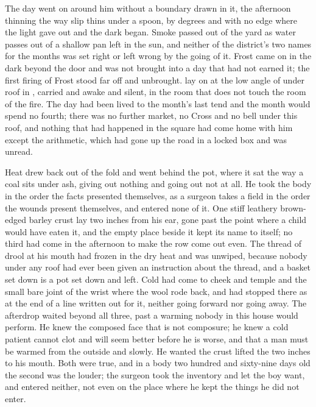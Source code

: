 The day went on around him without a boundary drawn in it, the afternoon thinning the way slip thins under a spoon, by degrees and with no edge where the light gave out and the dark began. Smoke passed out of the yard as water passes out of a shallow pan left in the sun, and neither of the district's two names for the months was set right or left wrong by the going of it. Frost came on in the dark beyond the door and was not brought into a day that had not earned it; the first firing of Frost stood far off and unbrought.  lay on  at the low angle of  under  roof in , carried and awake and silent, in the room that does not touch the room of the fire. The day had been lived to the month's last tend and the month would spend no fourth; there was no further market, no Cross and no bell under this roof, and nothing that had happened in the square had come home with him except the arithmetic, which had gone up the road in a locked box and was unread.

Heat drew back out of the fold and went behind the pot, where it sat the way a coal sits under ash, giving out nothing and going out not at all. He took the body in the order the facts presented themselves, as a surgeon takes a field in the order the wounds present themselves, and entered none of it. One stiff leathery brown-edged barley crust lay two inches from his ear, gone past the point where a child would have eaten it, and the empty place beside it kept its name to itself; no third had come in the afternoon to make the row come out even. The thread of drool at his mouth had frozen in the dry heat and was unwiped, because nobody under any roof had ever been given an instruction about the thread, and a basket set down is a pot set down and left. Cold had come to cheek and temple and the small bare joint of the wrist where the wool rode back, and had stopped there as at the end of a line written out for it, neither going forward nor going away. The afterdrop waited beyond all three, past a warming nobody in this house would perform. He knew the composed face that is not composure; he knew a cold patient cannot clot and will seem better before he is worse, and that a man must be warmed from the outside and slowly. He wanted the crust lifted the two inches to his mouth. Both were true, and in a body two hundred and sixty-nine days old the second was the louder; the surgeon took the inventory and let the boy want, and entered neither, not even on the place where he kept the things he did not enter.

